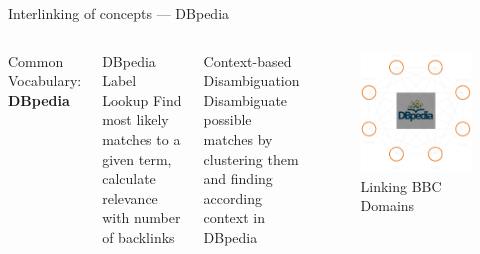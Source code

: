\documentclass[10pt]{beamer}
\begin{document}
\begin{frame}[fragile]{Interlinking of concepts — DBpedia}

  \begin{columns}[T,onlytextwidth]
      Common Vocabulary: {\textbf{DBpedia}}
      \bigskip
      \begin{alertblock}{DBpedia Label Lookup}
        Find most likely matches to a given term, calculate relevance with number of backlinks
      \end{alertblock}

      \begin{alertblock}{Context-based Disambiguation}
        Disambiguate possible matches by clustering them and finding according context in DBpedia
      \end{alertblock}
      \begin{figure}
        \centering
          \includegraphics[width=\textwidth]{img/dbpedia.png}
        \caption{Linking BBC Domains}
      \end{figure}

  \end{columns}

\end{frame}
\end{document}
